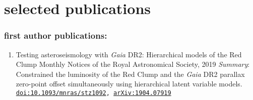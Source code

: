\documentclass[letterpaper]{k-cv} %
\begin{document}

\vspace{0.5cm}
\section{\color{c2}selected publications}
\vspace{-0.5cm}
\subsubsection*{\color{c2}first author publications:}
\vspace{-0.2cm}
\begin{enumerate}
	\item {}
	{Testing asteroseismology with \textit{Gaia} DR2: Hierarchical models of the Red Clump}
	{Monthly Notices of the Royal Astronomical Society, 2019}
	{\textit{Summary}: Constrained the luminosity of the Red Clump and the \textit{Gaia} DR2 parallax zero-point offset simultaneously using hierarchical latent variable models.}
	{\texttt{\href{https://academic.oup.com/mnras/article-abstract/486/3/3569/5475128}{doi:10.1093/mnras/stz1092}, \href{https://arxiv.org/abs/1904.07919}{arXiv:1904.07919}}}
\end{enumerate}
\end{document}
